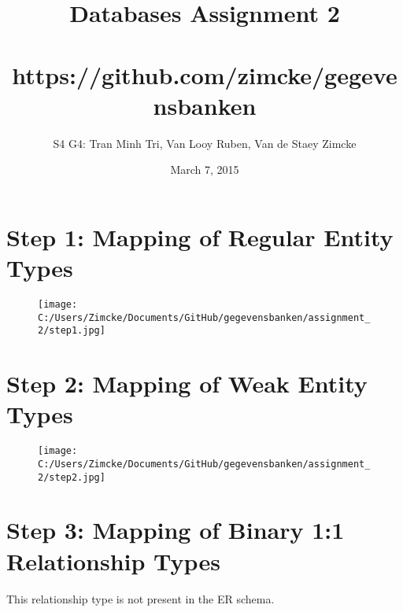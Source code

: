 \documentclass[a4paper,twoside,10pt]{report}
\begin{document}
\pagestyle{empty} %



\title{Databases Assignment 2 \\ \\
\vspace{1cm}
\large{https://github.com/zimcke/gegevensbanken
}
} 
\author{S4 G4: Tran Minh Tri, Van Looy Ruben, Van de Staey Zimcke}
\date{March 7, 2015} %
\maketitle




\pagestyle{plain} %






\begin{landscape}
\section{Step 1: Mapping of Regular Entity Types}\label{hints}


\begin{figure}[hp]
		\texttt{[image: C:/Users/Zimcke/Documents/GitHub/gegevensbanken/assignment\_2/step1.jpg]}
	\label{fig:step1}
\end{figure}

\section{Step 2: Mapping of Weak Entity Types}\label{hints}


\begin{figure}[hp]
		\texttt{[image: C:/Users/Zimcke/Documents/GitHub/gegevensbanken/assignment\_2/step2.jpg]}
	\label{fig:step1}
\end{figure}

\section{Step 3: Mapping of Binary 1:1 Relationship Types}\label{hints}

This relationship type is not present in the ER schema.
\end{landscape}
\restoregeometry
\end{document}
